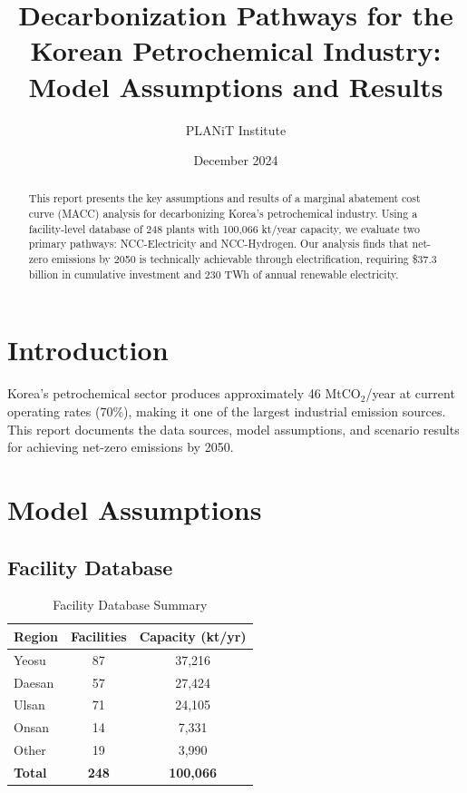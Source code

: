 \documentclass[12pt,a4paper]{article}
\title{Decarbonization Pathways for the Korean Petrochemical Industry:\\Model Assumptions and Results}
\author{PLANiT Institute}
\date{December 2024}
\begin{document}
\maketitle

\begin{abstract}
This report presents the key assumptions and results of a marginal abatement cost curve (MACC) analysis for decarbonizing Korea's petrochemical industry. Using a facility-level database of 248 plants with 100,066 kt/year capacity, we evaluate two primary pathways: NCC-Electricity and NCC-Hydrogen. Our analysis finds that net-zero emissions by 2050 is technically achievable through electrification, requiring \$37.3 billion in cumulative investment and 230 TWh of annual renewable electricity.
\end{abstract}

\section{Introduction}

Korea's petrochemical sector produces approximately 46 MtCO$_2$/year at current operating rates (70\%), making it one of the largest industrial emission sources. This report documents the data sources, model assumptions, and scenario results for achieving net-zero emissions by 2050.

\section{Model Assumptions}

\subsection{Facility Database}

\begin{table}[H]
\centering
\caption{Facility Database Summary}
\begin{tabular}{lcc}
\toprule
Region & Facilities & Capacity (kt/yr) \\
\midrule
Yeosu & 87 & 37,216 \\
Daesan & 57 & 27,424 \\
Ulsan & 71 & 24,105 \\
Onsan & 14 & 7,331 \\
Other & 19 & 3,990 \\
\midrule
\textbf{Total} & \textbf{248} & \textbf{100,066} \\
\bottomrule
\end{tabular}
\end{table}
\end{document}

